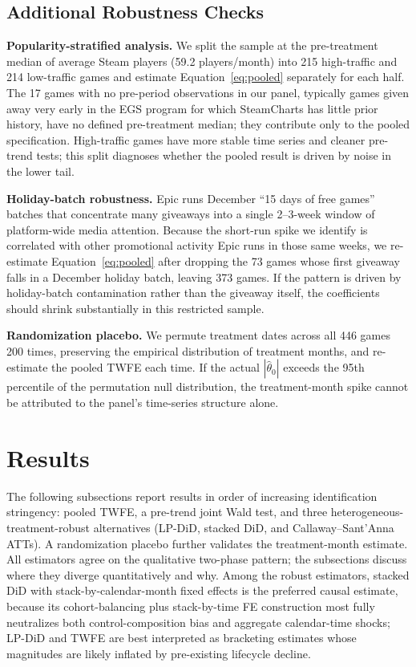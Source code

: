 \documentclass[11pt]{article}
\begin{document}
\subsection{Additional Robustness Checks}

\textbf{Popularity-stratified analysis.} We split the sample at the pre-treatment median
of average Steam players (59.2 players/month) into 215 high-traffic and 214
low-traffic games and estimate Equation~\eqref{eq:pooled}
separately for each half. The 17 games with no pre-period observations in our panel,
typically games given away very early in the EGS program for which SteamCharts has
little prior history, have no
defined pre-treatment median; they contribute
only to the pooled specification. High-traffic games have more stable time series and
cleaner pre-trend tests; this split diagnoses whether the pooled result is driven by
noise in the lower tail.

\textbf{Holiday-batch robustness.} Epic runs December ``15 days of free games''
batches that concentrate many giveaways into a single 2--3-week window of
platform-wide media attention. Because the short-run spike we identify is 
correlated with other promotional activity Epic runs in those
same weeks, we re-estimate Equation~\eqref{eq:pooled} after dropping the 73 games
whose first giveaway falls in a December holiday batch, leaving 373 games. If the
pattern is driven by holiday-batch contamination rather than the giveaway itself,
the coefficients should shrink substantially in this restricted sample.

\textbf{Randomization placebo.} We permute treatment dates across all 446 games 200
times, preserving the empirical distribution of treatment months, and re-estimate the
pooled TWFE each time. If the actual $|\hat{\theta}_0|$ exceeds the 95th percentile of
the permutation null distribution, the treatment-month spike cannot be attributed to the
panel's time-series structure alone.

\section{Results}
\label{sec:results}

The following subsections report results in order of increasing identification
stringency: pooled TWFE, a pre-trend joint Wald test,
and three heterogeneous-treatment-robust alternatives (LP-DiD, stacked DiD,
and Callaway--Sant'Anna ATTs). A randomization placebo further validates the
treatment-month estimate. All estimators agree on the qualitative two-phase
pattern; the subsections discuss where they diverge quantitatively and why.
Among the robust estimators, stacked DiD with stack-by-calendar-month fixed effects
is the preferred causal estimate, because its cohort-balancing plus stack-by-time
FE construction most fully neutralizes both control-composition bias and aggregate
calendar-time shocks; LP-DiD and TWFE are best interpreted as bracketing estimates
whose magnitudes are likely inflated by pre-existing lifecycle decline.
\end{document}
